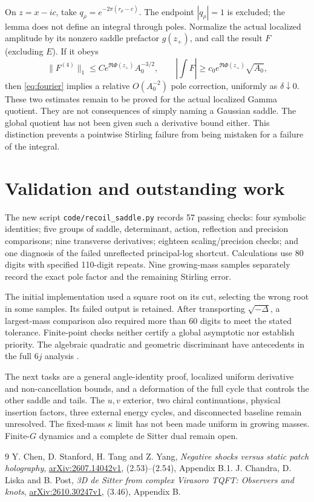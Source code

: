 \documentclass[11pt,a4paper]{article}
\begin{document}
On \(z=x-ic\), take \(q_\rho=e^{-2\pi(r_\rho-c)}\).
The endpoint \(|q_\rho|=1\) is excluded; the lemma does not define
an integral through poles. Normalize the actual localized amplitude
by its nonzero saddle prefactor \(g(z_+)\), and call the result \(F\)
(excluding \(E\)). If it obeys
\[
 \|F^{(4)}\|_1\le C e^{\Re\Phi(z_+)}A_0^{-3/2},
 \qquad
 \left|\int F\right|\ge c_0e^{\Re\Phi(z_+)}\sqrt{A_0},
\]
then \eqref{eq:fourier} implies a relative \(O(A_0^{-2})\) pole
correction, uniformly as \(\delta\downarrow0\).
These two estimates remain to be proved for the actual localized
Gamma quotient. They are not consequences of simply naming a
Gaussian saddle. The global quotient has not been given such a
derivative bound either. This distinction prevents a pointwise
Stirling failure from being mistaken for a failure of the integral.

\section{Validation and outstanding work}
The new script \texttt{code/recoil\_saddle.py} records 57 passing checks:
four symbolic identities; five groups of saddle, determinant, action,
reflection and precision comparisons; nine transverse derivatives;
eighteen scaling/precision checks; and one diagnosis of the failed
unreflected principal-log shortcut. Calculations use 80 digits with
specified 110-digit repeats. Nine growing-mass samples separately
record the exact pole factor and the remaining Stirling error.

The initial implementation used a square root on its cut, selecting
the wrong root in some samples. Its failed output is retained.
After transporting \(\sqrt{-\Delta}\), a largest-mass comparison
also required more than 60 digits to meet the stated tolerance.
Finite-point checks neither certify a global asymptotic nor establish
priority. The algebraic quadratic and geometric discriminant have
antecedents in the full \(6j\) analysis \cite{CLP}.

The next tasks are a general angle-identity proof, localized uniform
derivative and non-cancellation bounds, and a deformation of the full
cycle that controls the other saddle and tails. The \(u,v\) exterior,
two chiral continuations, physical insertion factors, three external
energy cycles, and disconnected baseline remain unresolved.
The fixed-mass \(\kappa\) limit has not been made uniform in growing
masses. Finite-\(G\) dynamics and a complete de Sitter dual remain open.

\begin{thebibliography}{9}
 Y. Chen, D. Stanford, H. Tang and Z. Yang,
\emph{Negative shocks versus static patch holography},
\href{https://arxiv.org/html/2607.14042v1}{arXiv:2607.14042v1},
(2.53)--(2.54), Appendix B.1.
 J. Chandra, D. Liska and B. Post,
\emph{3D de Sitter from complex Virasoro TQFT: Observers and knots},
\href{https://arxiv.org/html/2610.30247v1}{arXiv:2610.30247v1},
(3.46), Appendix B.
\end{thebibliography}
\end{document}
